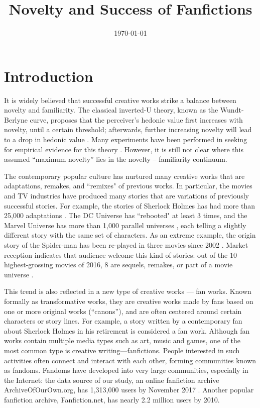 \documentclass[a4paper]{article}
\begin{document}

\title{Novelty and Success of Fanfictions} %
\date{\today}
\maketitle %

\section{Introduction} %
\label{sec:introduction}

It is widely believed that successful creative works strike a balance between novelty and familiarity. The classical inverted-U theory, known as the Wundt-Berlyne curve, proposes that the perceiver's hedonic value first increases with novelty, until a certain threshold; afterwards, further increasing novelty will lead to a drop in hedonic value \cite{berlyne1970novelty}. Many experiments have been performed in seeking for empirical evidence for this theory \cite{hargreaves1984effects} \cite{sluckin1980liking}. However, it is still not clear where this assumed ``maximum novelty'' lies in the novelty -- familiarity continuum.

The contemporary popular culture has nurtured many creative works that are adaptations, remakes, and ``remixes" \cite{manovich2007comes} of previous works. In particular, the movies and TV industries have produced many stories that are variations of previously successful stories. For example, the stories of Sherlock Holmes has had more than 25,000 adaptations \cite{doyle2007new}. The DC Universe has ``rebooted" at least 3 times, and the Marvel Universe has more than 1,000 parallel universes \cite{marvelmultiverse}, each telling a slightly different story with the same set of characters. As an extreme example, the origin story of the Spider-man has been re-played in three movies since 2002 \cite{spiderman}. Market reception indicates that audience welcome this kind of stories: out of the 10 highest-grossing movies of 2016, 8 are sequels, remakes, or part of a movie universe \cite{2016film}.

This trend is also reflected in a new type of creative works --- fan works. Known formally as transformative works, they are creative works made by fans based on one or more original works (``canons''), and are often centered around certain characters or story lines\cite{wiki:transf_work}. For example, a story written by a contemporary fan about Sherlock Holmes in his retirement is considered a fan work. Although fan works contain multiple media types such as art, music and games, one of the most common type is creative writing---fanfictions. People interested in such activities often connect and interact with each other, forming communities known as fandoms\cite{wiki:fandom}. Fandoms have developed into very large communities, especially in the Internet: the data source of our study, an online fanfiction archive ArchiveOfOurOwn.org, has 1,313,000 users by November 2017 \cite{ao3stats}. Another popular fanfiction archive, Fanfiction.net, has nearly 2.2 million users \cite{fanfiction.net} by 2010.
\end{document}
